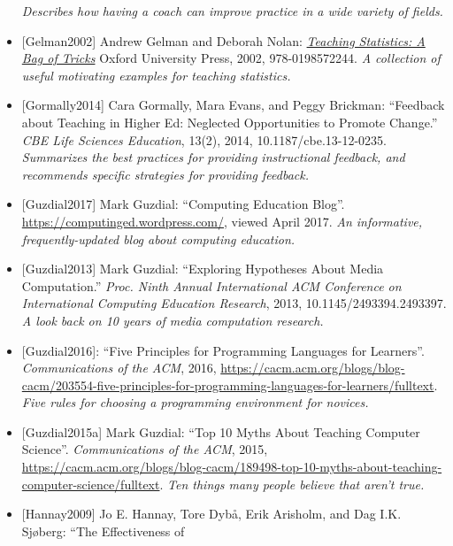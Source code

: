 \documentclass[10pt,statementpaper]{memoir}
\begin{document}
\begin{itemize}
  \emph{Describes how having a coach can improve practice in a wide
  variety of fields.}
\item
  \protect\hypertarget{gelman-stats}{}{{[}Gelman2002{]}} Andrew Gelman
  and Deborah Nolan:
  \emph{\href{https://www.amazon.com/Teaching-Statistics-Tricks-Andrew-Gelman/dp/0198572247/}{Teaching
  Statistics: A Bag of Tricks}} Oxford University Press, 2002,
  978-0198572244. \emph{A collection of useful motivating examples for
  teaching statistics.}
\item
  \protect\hypertarget{gormally-teaching-feedback}{}{{[}Gormally2014{]}}
  Cara Gormally, Mara Evans, and Peggy Brickman: ``Feedback about
  Teaching in Higher Ed: Neglected Opportunities to Promote Change.''
  \emph{CBE Life Sciences Education}, 13(2), 2014,
  10.1187/cbe.13-12-0235. \emph{Summarizes the best practices for
  providing instructional feedback, and recommends specific strategies
  for providing feedback.}
\item
  \protect\hypertarget{guzdial-blog}{}{{[}Guzdial2017{]}} Mark Guzdial:
  ``Computing Education Blog''.
  \url{https://computinged.wordpress.com/}, viewed April 2017. \emph{An
  informative, frequently-updated blog about computing education.}
\item
  \protect\hypertarget{guzdial-mediacomp-retrospective}{}{{[}Guzdial2013{]}}
  Mark Guzdial: ``Exploring Hypotheses About Media Computation.''
  \emph{Proc. Ninth Annual International ACM Conference on International
  Computing Education Research}, 2013, 10.1145/2493394.2493397. \emph{A
  look back on 10 years of media computation research.}
\item
  \protect\hypertarget{guzdial-principles}{}{{[}Guzdial2016{]}}: ``Five
  Principles for Programming Languages for Learners''.
  \emph{Communications of the ACM}, 2016,
  \url{https://cacm.acm.org/blogs/blog-cacm/203554-five-principles-for-programming-languages-for-learners/fulltext}.
  \emph{Five rules for choosing a programming environment for novices.}
\item
  \protect\hypertarget{guzdial-top10}{}{{[}Guzdial2015a{]}} Mark
  Guzdial: ``Top 10 Myths About Teaching Computer Science''.
  \emph{Communications of the ACM}, 2015,
  \url{https://cacm.acm.org/blogs/blog-cacm/189498-top-10-myths-about-teaching-computer-science/fulltext}.
  \emph{Ten things many people believe that aren't true.}
\item
  \protect\hypertarget{hannay-pairing}{}{{[}Hannay2009{]}} Jo E. Hannay,
  Tore Dybå, Erik Arisholm, and Dag I.K. Sjøberg: ``The Effectiveness of

\end{itemize}
\end{document}
